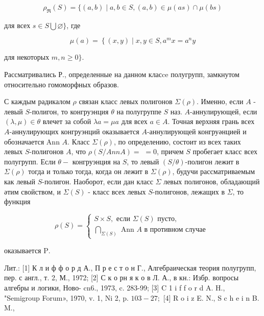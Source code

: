 \documentclass[10pt]{article}
\begin{document}
\[

\rho_{\Re}(S)=\{(a, b) \mid a, b \in S,(a, b) \in \mu(a s) \cap \mu(b s)

\]



для всех $s \in S \bigcup \varnothing\}$, где



\[

\mu(a)=\left\{(x, y) \mid x, y \in S, a^{m} x=a^{n} y\right.

\]



для некоторых $m, n \geqslant 0\}$.



Рассматривались Р., определенные на данном класce полугрупп, замкнутом относительно гомоморфных образов.



С каждым радикалом $\rho$ связан класс левых полигонов $\Sigma(\rho)$. Именно, если $A$ - левый $S$-полигон, то конгруэнция $\theta$ на полугруппе $S$ наз. $A$-аннулирующей, если $(\lambda, \mu) \in \theta$ влечет за собой $\lambda a=\mu a$ для всех $a \in A$. Точная верхняя грань всех $A$-аннулирующих конгруэнций оказывается $A$-аннулирующей конгруәнцией и обозначается Ann $A$. Класс $\Sigma(\rho)$, по определению, состоит из всех таких левых $S$-полигонов $A$, что $\rho(S / A n n A)=$ $=0$, причем $S$ пробегает класс всех полугрупп. Если $\theta-$ конгруэнция на $S$, то левый $(S / \theta)$-полигон лежит в $\Sigma(\rho)$ тогда и только тогда, когда он лежит в $\Sigma(\rho)$, будучи рассматриваемым как левый $S$-полигон. Наоборот, если дан класс $\Sigma$ левых полигонов, обладающий әтим свойством, и $\Sigma(S)$ - класс всех левых $S$-полигонов, лежащих в $\Sigma$, то функция



\[

\rho(S)=\left\{\begin{array}{c}

S \times S, \text { если } \Sigma(S) \text { пусто, } \\

\bigcap_{\Sigma(S)} \text { Ann } A \text { в противном случае }

\end{array}\right.

\]



оказывается $\mathrm{P}$.



Лит.: [1] К л и ф ф о р д А., П р е с т о н Г., Алгебраическая теория полугрупп, пер. с англ., т. 2, М., 1972; [2] С к о рн я к о в Л. А., в кн.: Избр. вопросы алгебры и логики, Ново- cn6., 1973, c. 283-99; [3] C 1 i f f o r d A. H., "Semigroup Forum», 1970, v. 1, Ni 2, p. $103-27 ;$ [4] R o i z E. N., S c h e i n B. M.,
\end{document}
